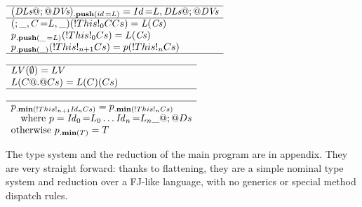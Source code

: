\noindent
\begin{minipage}{0.48\textwidth}
	\noindent\!\!\!$\begin{array}{l}
	\hline
	(\DLs\Q@;@ \DVs)\op{push}{id\eq{L}} =
	\Id\eq{L},\DLs\Q@;@ \DVs\\
	\hline
	(; \_, C\eq{L}, \_)(\This{0}{C}{Cs})=\mathit{L(Cs)}\\
	p\op{push}{\_\eq{L}}(\This{0}{Cs})=L(\mathit{Cs})\\
	p\op{push}{\_}(\This{n+1}{Cs})=p(\This{n}{Cs})\\
	\hline
	\end{array}$
\end{minipage}%
\begin{minipage}{0.5\textwidth}
	$\begin{array}{l}
	\hline
	LV({\emptyset})=LV\\
	L(C\Q@.@Cs)=L(C)(Cs)\\
	\hline
	\\\hline
	p\op{min}{\This{n+1}{\Id_n}{Cs}} = p\op{min}{\This{n}{Cs}}\\\quad
	\text{where }p = \Id_0 \eq{L_0}\ldots\Id_n\eq{L_n} \_\Q@;@ Ds\\
	\text{otherwise } p\op{min}{T} = T\\
	\end{array}$
\end{minipage}



The type system and the reduction of the main program are in appendix. They are very straight forward: thanks to flattening, they are a simple nominal type system and reduction over a FJ-like language, with no generics or special method dispatch rules.




